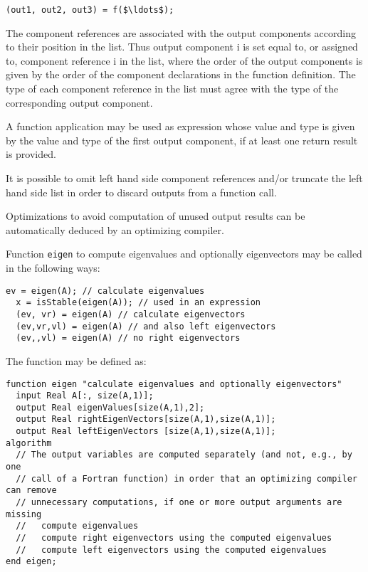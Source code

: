 \lstinline[mathescape=true]!(out1, out2, out3) = f($\ldots$);!

The component references are associated with the output components
according to their position in the list. Thus output component i is set
equal to, or assigned to, component reference i in the list, where the
order of the output components is given by the order of the component
declarations in the function definition. The type of each component
reference in the list must agree with the type of the corresponding
output component.

A function application may be used as expression whose value and type is
given by the value and type of the first output component, if at least
one return result is provided.

It is possible to omit left hand side component references and/or
truncate the left hand side list in order to discard outputs from a
function call.

\begin{nonnormative}
Optimizations to avoid computation of unused output results can
be automatically deduced by an optimizing compiler.
\end{nonnormative}

\begin{example}
Function \lstinline!eigen! to compute eigenvalues and optionally
eigenvectors may be called in the following ways:
\begin{lstlisting}[language=modelica]
  ev = eigen(A); // calculate eigenvalues
  x = isStable(eigen(A)); // used in an expression
  (ev, vr) = eigen(A) // calculate eigenvectors
  (ev,vr,vl) = eigen(A) // and also left eigenvectors
  (ev,,vl) = eigen(A) // no right eigenvectors
\end{lstlisting}
The function may be defined as:
\begin{lstlisting}[language=modelica]
function eigen "calculate eigenvalues and optionally eigenvectors"
  input Real A[:, size(A,1)];
  output Real eigenValues[size(A,1),2];
  output Real rightEigenVectors[size(A,1),size(A,1)];
  output Real leftEigenVectors [size(A,1),size(A,1)];
algorithm
  // The output variables are computed separately (and not, e.g., by one
  // call of a Fortran function) in order that an optimizing compiler can remove
  // unnecessary computations, if one or more output arguments are missing
  //   compute eigenvalues
  //   compute right eigenvectors using the computed eigenvalues
  //   compute left eigenvectors using the computed eigenvalues
end eigen;
\end{lstlisting}
\end{example}

